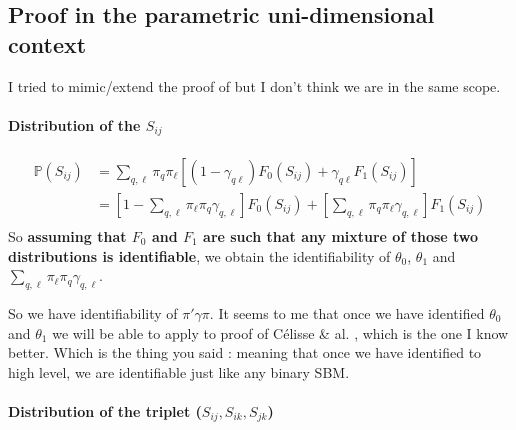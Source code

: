 \subsection{Proof in the parametric uni-dimensional context}

I tried to mimic/extend the proof of \cite{AMR10}  but I don't think we are in the same scope.  

\paragraph{Distribution of the $S_{ij}$}

 \begin{align*}
 \mathbb{P}(S_{ij}) &= \sum_{q,\ell} \pi_{q} \pi_{\ell} [ (1-\gamma_{q\ell})F_0(S_{ij}) + \gamma_{q\ell} F_1(S_{ij} )]\\
&= \left[1-  \sum_{q, \ell}  \pi_\ell \pi_q  \gamma_{q,\ell} \right] F_{0}(S_{ij}) +   \left[ \sum_{q, \ell}  \pi_q \pi_\ell    \gamma_{q,\ell} \right] F_{1}(S_{ij})\\
 \end{align*}
So \textbf{assuming that $F_0$ and $F_1$ are such that any mixture of those two distributions is identifiable}, we obtain the identifiability of $\theta_0$, $\theta_1$ and $ \sum_{q, \ell}  \pi_{\ell} \pi_q   \gamma_{q,\ell}$. 


So we have identifiability of $\pi'  \gamma  \pi$. 
It seems to me that once we have identified $\theta_0$ and $\theta_1$ we will be able to apply to proof of Célisse \& al. \cite{CDP12}, which is the one I know better. Which is the thing you said : meaning that once we have identified to high level, we are identifiable just like any binary SBM. 







\paragraph{Distribution of the triplet  ($S_{ij},S_{ik}, S_{jk}$)}

